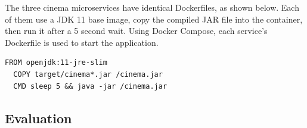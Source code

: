 The three cinema microservices have identical Dockerfiles, as shown below. Each of them use a JDK 11 base image, copy the compiled JAR file into the container, then run it after a 5 second wait. Using Docker Compose, each service's Dockerfile is used to start the application.

\begin{lstlisting}[caption=Dockerfile for cinema services]
  FROM openjdk:11-jre-slim
  COPY target/cinema*.jar /cinema.jar
  CMD sleep 5 && java -jar /cinema.jar
\end{lstlisting}


\subsection{Evaluation}
